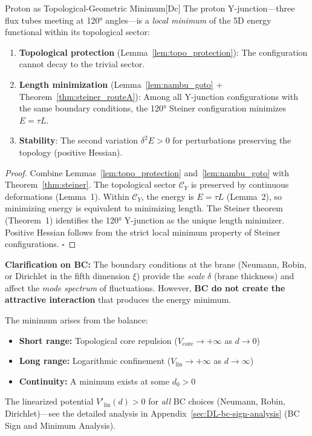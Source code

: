 \begin{edcCorollaryBox}{Proton as Topological-Geometric Minimum}{[Dc]}
\label{cor:proton_minimum}
The proton Y-junction---three flux tubes meeting at 120° angles---is a
\emph{local minimum} of the 5D energy functional within its topological sector:
\begin{enumerate}[nosep]
  \item \textbf{Topological protection} (Lemma~\ref{lem:topo_protection}): The configuration
        cannot decay to the trivial sector.
  \item \textbf{Length minimization} (Lemma~\ref{lem:nambu_goto} + Theorem~\ref{thm:steiner_routeA}):
        Among all Y-junction configurations with the same boundary conditions,
        the 120° Steiner configuration minimizes $E = \tau L$.
  \item \textbf{Stability}: The second variation $\delta^2 E > 0$ for perturbations
        preserving the topology (positive Hessian).
\end{enumerate}
\end{edcCorollaryBox}

\begin{proof}
Combine Lemmas~\ref{lem:topo_protection} and~\ref{lem:nambu_goto} with
Theorem~\ref{thm:steiner}. The topological sector $\mathcal{C}_Y$ is preserved
by continuous deformations (Lemma~1). Within $\mathcal{C}_Y$, the energy is
$E = \tau L$ (Lemma~2), so minimizing energy is equivalent to minimizing length.
The Steiner theorem (Theorem~1) identifies the 120° Y-junction as the unique
length minimizer. Positive Hessian follows from the strict local minimum property
of Steiner configurations. \hfill $\square$
\end{proof}

\begin{tcolorbox}[colback=yellow!5!white, colframe=yellow!50!black,
                  title={\textbf{Remark: Role of Boundary Conditions}}]
\textbf{Clarification on BC:} The boundary conditions at the brane (Neumann, Robin,
or Dirichlet in the fifth dimension $\xi$) provide the \emph{scale} $\delta$
(brane thickness) and affect the \emph{mode spectrum} of fluctuations. However,
\textbf{BC do not create the attractive interaction} that produces the energy minimum.

The minimum arises from the balance:
\begin{itemize}[nosep]
  \item \textbf{Short range:} Topological core repulsion ($V_{\mathrm{core}} \to +\infty$ as $d \to 0$)
  \item \textbf{Long range:} Logarithmic confinement ($V_{\mathrm{lin}} \to +\infty$ as $d \to \infty$)
  \item \textbf{Continuity:} A minimum exists at some $d_0 > 0$
\end{itemize}

The linearized potential $V'_{\mathrm{lin}}(d) > 0$ for \emph{all} BC choices
(Neumann, Robin, Dirichlet)---see the detailed analysis in
Appendix~\ref{sec:DL-bc-sign-analysis} (BC Sign and Minimum Analysis).
\end{tcolorbox}

